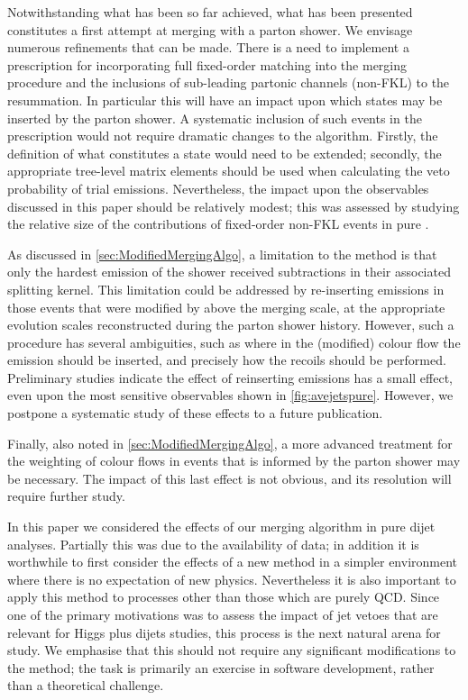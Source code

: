 Notwithstanding what has been so far achieved, what has been presented constitutes a first attempt at merging \HEJ with a parton shower. We envisage numerous 
refinements that can be made. There is a need to implement a prescription for
incorporating full fixed-order matching into the merging procedure and the
inclusions of sub-leading partonic channels (non-FKL) to the \HEJ resummation\cite{Andersen:2017kfc}. 
In particular this will have an impact upon which states may be inserted by the parton
shower. A systematic
inclusion of such events in the prescription would not require dramatic changes to the algorithm. Firstly, the definition of what constitutes a \HEJ state would need to be extended;
secondly, the appropriate tree-level matrix elements should be used when calculating the veto probability of trial emissions. 
Nevertheless, the impact upon the observables discussed in this
paper should be relatively modest; this was assessed by studying the relative size of the 
contributions of fixed-order non-FKL events in pure \HEJ.

As discussed in \cref{sec:ModifiedMergingAlgo}, a limitation to the method is that only
the hardest emission of the shower received subtractions in their associated splitting kernel.
This limitation could be addressed by re-inserting \HEJ emissions in those events that were modified by 
\pyt above the merging scale, at the appropriate evolution scales reconstructed during the parton shower history.
However, such a procedure has several ambiguities, such as where in the (modified) colour flow the emission should be
inserted, and precisely how the recoils should be performed. Preliminary studies indicate the effect of
reinserting \HEJ emissions has a small effect, even upon the most sensitive observables shown in \cref{fig:avejetspure}.
However, we postpone a systematic study of these effects to a future publication. 

Finally, also noted  in \cref{sec:ModifiedMergingAlgo}, a more advanced treatment for the weighting of colour flows in \HEJ events
that is informed by the parton shower may be necessary. The impact of this last effect is not obvious, and its resolution will require further study. 

In this paper we considered the effects of our merging algorithm in pure dijet analyses. 
Partially this was due to the availability of data; in addition it is worthwhile to first consider the effects of 
a new method in a simpler environment where there is no expectation of new physics.
Nevertheless it  is also important to apply this method to processes other than those which are purely QCD.
Since one of the primary motivations was to assess the impact of jet vetoes
that are relevant for Higgs plus dijets studies, this process is the next natural arena for study. 
We emphasise that this should not require any significant modifications to the method; 
the task is primarily an exercise in software development, rather than a theoretical challenge.


